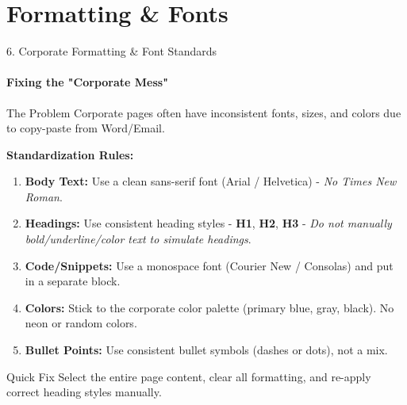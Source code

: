 \documentclass[10pt, aspectratio=169]{beamer}
\begin{document}
	\section{Formatting \& Fonts}
	\begin{frame}{6. Corporate Formatting \& Font Standards}
		\framesubtitle{Fixing the "Corporate Mess"}
		\begin{block}{The Problem}
			Corporate pages often have inconsistent fonts, sizes, and colors due to copy-paste from Word/Email.
		\end{block}
		
		\pause
		\textbf{Standardization Rules:}
		\begin{enumerate}
			\item \textbf{Body Text:} Use a clean sans-serif font (Arial / Helvetica) - \textit{No Times New Roman}.
			\item \textbf{Headings:} Use consistent heading styles - \textbf{H1}, \textbf{H2}, \textbf{H3} - \textit{Do not manually bold/underline/color text to simulate headings}.
			\item \textbf{Code/Snippets:} Use a monospace font (Courier New / Consolas) and put in a separate block.
			\item \textbf{Colors:} Stick to the corporate color palette (primary blue, gray, black). No neon or random colors.
			\item \textbf{Bullet Points:} Use consistent bullet symbols (dashes or dots), not a mix.
		\end{enumerate}
		\pause
		\begin{alertblock}{Quick Fix}
			Select the entire page content, clear all formatting, and re-apply correct heading styles manually.
		\end{alertblock}
	\end{frame}
	
\end{document}
